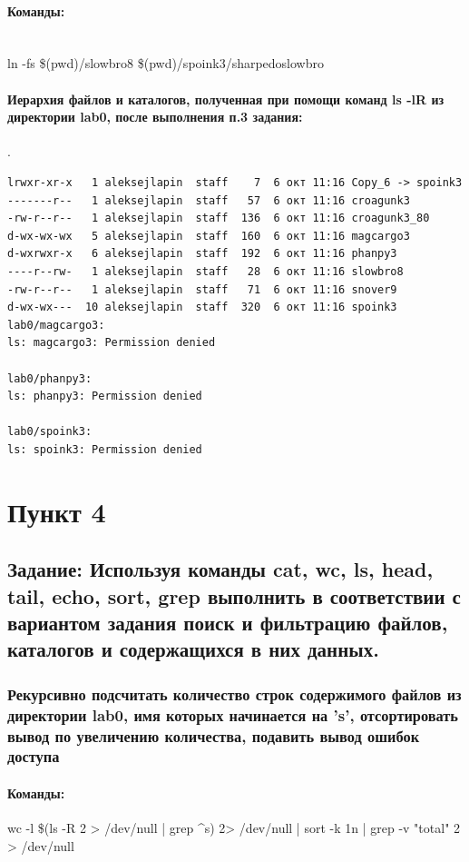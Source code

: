 \documentclass[12pt,onecolumn]{article}
\begin{document}
\paragraph{Команды:}\\
ln -fs \$(pwd)/slowbro8 \$(pwd)/spoink3/sharpedoslowbro\\
\paragraph{Иерархия файлов и каталогов, полученная при помощи команд ls -lR из директории lab0, после выполнения п.3 задания:}.
\begin{lstlisting}      
lrwxr-xr-x   1 aleksejlapin  staff    7  6 окт 11:16 Copy_6 -> spoink3
-------r--   1 aleksejlapin  staff   57  6 окт 11:16 croagunk3
-rw-r--r--   1 aleksejlapin  staff  136  6 окт 11:16 croagunk3_80
d-wx-wx-wx   5 aleksejlapin  staff  160  6 окт 11:16 magcargo3
d-wxrwxr-x   6 aleksejlapin  staff  192  6 окт 11:16 phanpy3
----r--rw-   1 aleksejlapin  staff   28  6 окт 11:16 slowbro8
-rw-r--r--   1 aleksejlapin  staff   71  6 окт 11:16 snover9
d-wx-wx---  10 aleksejlapin  staff  320  6 окт 11:16 spoink3
lab0/magcargo3:
ls: magcargo3: Permission denied

lab0/phanpy3:
ls: phanpy3: Permission denied

lab0/spoink3:
ls: spoink3: Permission denied
\end{lstlisting}

\section{Пункт 4}
\subsection{Задание: Используя команды cat, wc, ls, head, tail, echo, sort, grep выполнить в соответствии с вариантом задания поиск и фильтрацию файлов, каталогов и содержащихся в них данных.}
\subsubsection{Рекурсивно подсчитать количество строк содержимого файлов из директории lab0, имя которых начинается на 's', отсортировать вывод по увеличению количества, подавить вывод ошибок доступа}
\paragraph{Команды:}
wc -l \$(ls -R 2 > /dev/null  | grep \^ \large s) 2> /dev/null | sort -k 1n | grep -v "total" \large 2 > /dev/null
\end{document}
